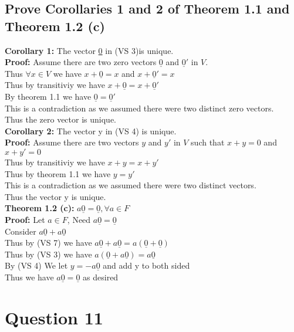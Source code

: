 \documentclass{article}
\begin{document}
\subsection*{Prove Corollaries 1 and 2 of Theorem 1.1 and Theorem 1.2 (c)}
\textbf{Corollary 1:} The vector \underline{0} in (VS 3)is unique.\\ 
\textbf{Proof:} Assume there are two zero vectors $\underline{0}$ and $\underline{0}'$ in $V$.\\
Thus $\forall x \in V$ we have $x + \underline{0} = x$ and $x + \underline{0}' = x$\\
Thus by transitiviy we have $x + \underline{0} = x + \underline{0}'$\\
By theorem 1.1 we have $\underline{0}  = \underline{0}'$\\
This is a contradiction as we assumed there were two distinct zero vectors.\\
Thus the zero vector is unique.\\
\textbf{Corollary 2:} The vector y in (VS 4) is unique.\\
\textbf{Proof:} Assume there are two vectors $y$ and $y'$ in $V$ such that $x + y = 0$ and $x + y' = 0$\\
Thus by transitiviy we have $x + y = x + y'$\\
Thus by theorem 1.1 we have $y = y'$\\
This is a contradiction as we assumed there were two distinct vectors.\\
Thus the vector y is unique.\\
\textbf{Theorem 1.2 (c):} $a\underline{0} = \underline{0}, \forall a \in F$\\
\textbf{Proof:} Let $a \in F$, Need $a \underline{0} = \underline{0}$\\
Consider $a\underline{0} + a \underline{0}$\\
Thus by (VS 7) we have $a\underline{0} + a\underline{0}= a(\underline{0} + \underline{0})$\\
Thus by (VS 3) we have $a(\underline{0} + a\underline{0}) = a\underline{0}$\\
By (VS 4) We let $y = -a \underline{0}$ and add y to both sided\\
Thus we have $a\underline{0} = \underline{0}$ as desired\\



\section*{Question 11}
\end{document}
